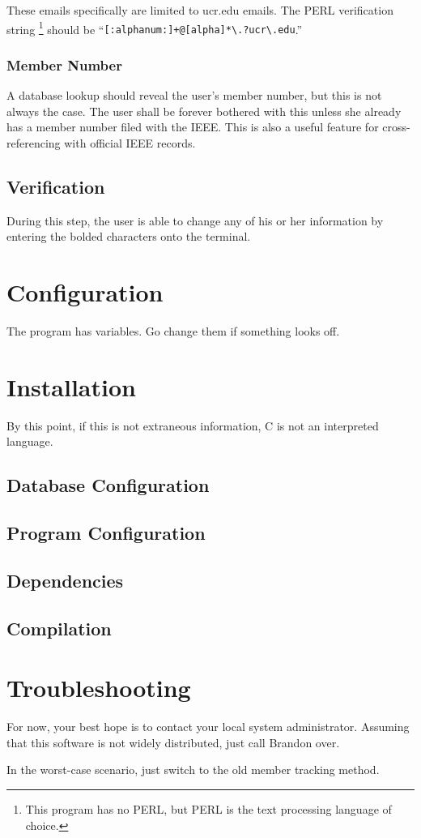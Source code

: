 \documentclass[12pt]{article}
\begin{document}
These emails specifically are limited to ucr.edu emails.  The PERL
verification string \footnote{This program has no PERL, but PERL is the
text processing language of choice.} should be 
``{\tt[:alphanum:]+@[alpha]*\textbackslash .?ucr\textbackslash .edu}.''
		\subsubsection{Member Number}
A database lookup should reveal the user's member number, but this is not
always the case.  The user shall be forever bothered with this unless she
already has a member number filed with the IEEE.  This is also a useful
feature for cross-referencing with official IEEE records.
	\subsection{Verification}
During this step, the user is able to change any of his or her information by
entering the bolded characters onto the terminal.

	\section{Configuration}
The program has variables.  Go change them if something looks off.

	\section{Installation}
By this point, if this is not extraneous information, C is not an interpreted
language.
		\subsection{Database Configuration}

		\subsection{Program Configuration}

	\subsection{Dependencies}

	\subsection{Compilation}

\section{Troubleshooting}
For now, your best hope is to contact your local system administrator.
Assuming that this software is not widely distributed, just call Brandon over.

In the worst-case scenario, just switch to the old member tracking method.
\end{document}
